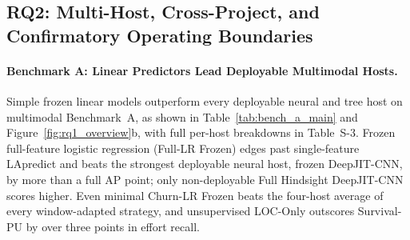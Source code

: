 \documentclass[pdflatex,sn-basic]{sn-jnl}
\theoremstyle{definition}
\theoremstyle{plain}
\begin{document}
\subsection{RQ2: Multi-Host, Cross-Project, and Confirmatory Operating Boundaries}
\label{sec:rq2}

\paragraph{Benchmark A: Linear Predictors Lead Deployable Multimodal Hosts.}
Simple frozen linear models outperform every deployable neural and tree host on multimodal Benchmark~A, as shown in Table~\ref{tab:bench_a_main} and Figure~\ref{fig:rq1_overview}b, with full per-host breakdowns in Table~S-3. Frozen full-feature logistic regression (Full-LR Frozen) edges past single-feature LApredict and beats the strongest deployable neural host, frozen DeepJIT-CNN, by more than a full AP point; only non-deployable Full Hindsight DeepJIT-CNN scores higher. Even minimal Churn-LR Frozen beats the four-host average of every window-adapted strategy, and unsupervised LOC-Only outscores Survival-PU by over three points in effort recall.
\end{document}
